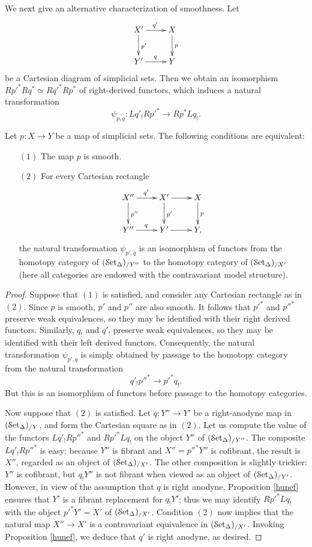 We next give an alternative characterization of smoothness. Let
$$ \xymatrix{ X' \ar[d]^{p'} \ar[r]^{q'} & X \ar[d]^{p} \\
Y' \ar[r]^{q} & Y }$$
be a Cartesian diagram of simplicial sets. Then we obtain an isomorphism
$R {p'}^{\ast} R q^{\ast} \simeq R {q'}^{\ast} R p^{\ast}$ of right-derived functors, which induces
a natural transformation
$$ \psi_{p,q}: L q'_{!} R {p'}^{\ast} \rightarrow R p^{\ast} L q_{!}.$$

\begin{proposition}\label{smoothbase}
Let $p: X \rightarrow Y$ be a map of simplicial sets. The following conditions are equivalent:
\begin{itemize}
\item[$(1)$] The map $p$ is smooth.
\item[$(2)$] For every Cartesian rectangle
$$ \xymatrix{ X'' \ar[d]^{p''} \ar[r]^{q'} & X' \ar[d]^{p'} \ar[r] & X \ar[d]^{p} \\
Y'' \ar[r]^{q} & Y' \ar[r] & Y, }$$ the natural transformation
$\psi_{p',q}$ is an isomorphism of functors from the homotopy category of
$(\operatorname{\mathcal{S}et_{\Delta}})_{/Y''}$ to the homotopy category of $(\operatorname{\mathcal{S}et_{\Delta}})_{/X'}$ (here all categories are
endowed with the contravariant model structure).
\end{itemize}
\end{proposition}

\begin{proof}
Suppose that $(1)$ is satisfied, and consider any Cartesian rectangle as in $(2)$. Since $p$ is smooth, $p'$ and $p''$ are also smooth. It follows that ${p'}^{\ast}$ and ${p''}^{\ast}$ preserve weak equivalences, so they may be identified with their right derived functors. Similarly, $q_{!}$ and $q'_{!}$ preserve weak equivalences, so they may be identified with their left derived functors. Consequently, the natural transformation $\psi_{p',q}$ is simply obtained by passage to the homotopy category from the natural transformation
$$ q'_{!} {p''}^{\ast} \rightarrow {p'}^{\ast} q_{!}.$$
But this is an isomorphism of functors before passage to the homotopy categories.

Now suppose that $(2)$ is satisfied. Let $q: Y'' \rightarrow Y'$ be a right-anodyne map
in $(\operatorname{\mathcal{S}et_{\Delta}})_{/Y}$, and form the Cartesian square as in $(2)$. Let us compute the value of the functors $L q'_{!} R {p''}^{\ast}$ and $R {p'}^{\ast} L q_{!}$ on the object $Y''$ of $(\operatorname{\mathcal{S}et_{\Delta}})_{/Y''}$. The composite $L q'_{!} R {p''}^{\ast}$ is easy: because $Y''$ is fibrant and
$X'' = {p''}^{\ast} Y''$ is cofibrant, the result is $X''$, regarded as an object of $(\operatorname{\mathcal{S}et_{\Delta}})_{/X'}$. The other composition is slightly trickier: $Y''$ is cofibrant, but $q_{!} Y''$ is not fibrant when viewed as an object of $(\operatorname{\mathcal{S}et_{\Delta}})_{/Y'}$. However, in view of the assumption that $q$ is right anodyne, Proposition \ref{hunef} ensures that $Y'$ is a fibrant replacement for $q_{!} Y'$; thus we may identify  $R {p'}^{\ast} L q_{!}$ with the object ${p'}^{\ast} Y' = X'$ of $(\operatorname{\mathcal{S}et_{\Delta}})_{/ X'}$. Condition $(2)$ now implies that the natural map $X'' \rightarrow X'$ is a contravariant equivalence in $(\operatorname{\mathcal{S}et_{\Delta}})_{/X'}$. Invoking Proposition \ref{hunef}, we deduce that $q'$ is right anodyne, as desired.
\end{proof}

